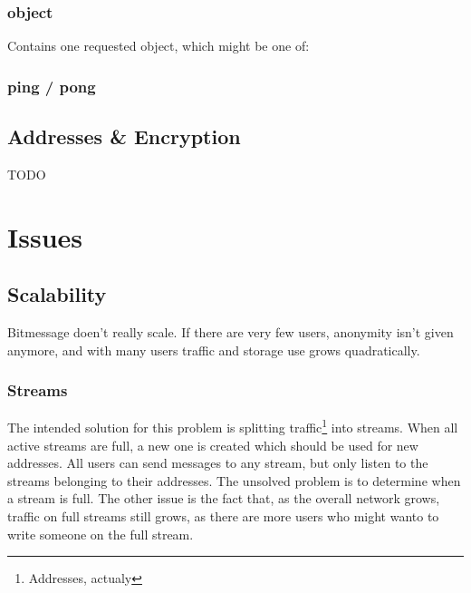 \documentclass{bfh}
\begin{document}
  \subsubsection{object}
  Contains one requested object, which might be one of:


  \subsubsection{ping / pong}

  \subsection{Addresses \& Encryption}
  \label{subsec:addrenc}
  TODO


  \section{Issues}

  \subsection{Scalability}

  Bitmessage doen't really scale. If there are very few users, anonymity isn't given anymore, and with many users traffic and storage use grows quadratically.

  \subsubsection{Streams}
  The intended solution for this problem is splitting traffic\footnote{Addresses, actualy} into streams. When all active streams are full, a new one is created which should be used for new addresses. All users can send messages to any stream, but only listen to the streams belonging to their addresses. The unsolved problem is to determine when a stream is full. The other issue is the fact that, as the overall network grows, traffic on full streams still grows, as there are more users who might wanto to write someone on the full stream.
\end{document}
